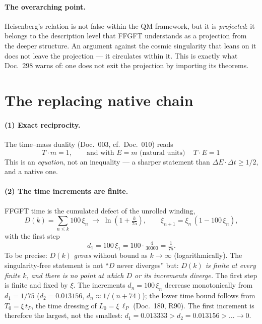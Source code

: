 \paragraph{The overarching point.} Heisenberg's relation is not false within the QM framework, but
it is \emph{projected}: it belongs to the description level that FFGFT understands as a projection
from the deeper structure. An argument against the cosmic singularity that leans on it does not
leave the projection --- it circulates within it. This is exactly what Doc.~298 warns of: one does
not exit the projection by importing its theorems.

\section{The replacing native chain}

\paragraph{(1) Exact reciprocity.} The time--mass duality (Doc.~003, cf.\ Doc.~010) reads
\begin{equation}
T \cdot m = 1, \qquad\text{and with } E = m \text{ (natural units)}\quad
\boxed{\,T \cdot E = 1\,}
\end{equation}
This is an \emph{equation}, not an inequality --- a sharper statement than
$\Delta E\cdot\Delta t \ge 1/2$, and a native one.

\paragraph{(2) The time increments are finite.} FFGFT time is the cumulated defect of the unrolled
winding,
\begin{equation}
D(k) = \sum_{n\le k} 100\,\xi_n \;\to\; \ln\!\left(1+\tfrac{k}{75}\right),
\qquad \xi_{n+1} = \xi_n\,(1-100\,\xi_n),
\end{equation}
with the first step
\begin{equation}
d_1 = 100\,\xi_1 = 100 \cdot \tfrac{4}{30000} = \tfrac{1}{75}.
\end{equation}
To be precise: $D(k)$ \emph{grows} without bound as $k\to\infty$ (logarithmically). The
singularity-free statement is not \enquote{$D$ never diverges} but: \emph{$D(k)$ is finite at
every finite $k$, and there is no point at which $D$ or its increments diverge.} The first step is
finite and fixed by $\xi$. The increments $d_n = 100\,\xi_n$ decrease monotonically from $d_1 = 1/75$
($d_2 = 0.013156$, $d_n \approx 1/(n+74)$); the lower time bound follows from $T_0 = \xi\,t_P$, the time dressing of $L_0 = \xi\,\ell_P$ (Doc.~180, R90).
The first increment is therefore the largest, not the smallest: $d_1 = 0.013333 > d_2 = 0.013156 > \dots \to 0$.

